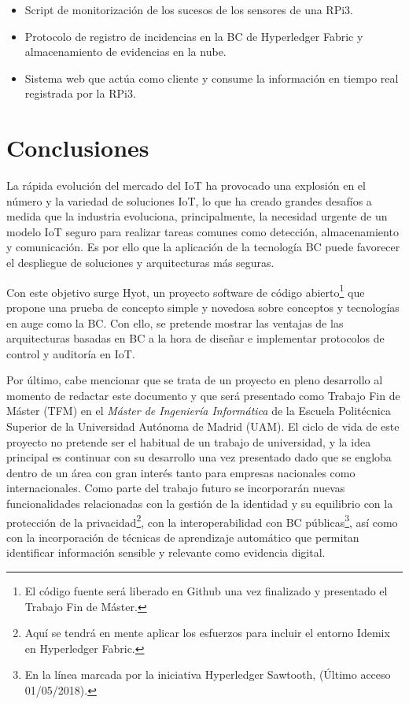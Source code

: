 \documentclass[10pt,conference,a4paper]{IEEEtran}
\begin{document}
\begin{itemize}
  \item Script de monitorización de los sucesos de los sensores de una RPi3.
  \item Protocolo de registro de incidencias en la BC de Hyperledger
    Fabric y almacenamiento de evidencias en la nube. 
  \item Sistema web que actúa como cliente y consume la
          información en tiempo real registrada por la RPi3.
\end{itemize}

\section{Conclusiones}

La rápida evolución del mercado del IoT ha provocado una explosión en
el número y la variedad de soluciones IoT, lo que ha creado grandes
desafíos a medida que la industria evoluciona, principalmente, la
necesidad urgente de un modelo IoT seguro para realizar tareas comunes
como detección, almacenamiento y comunicación. Es por ello que la
aplicación de la tecnología BC puede favorecer el despliegue de
soluciones y arquitecturas más seguras.

Con este objetivo surge Hyot, un proyecto software de código
abierto\footnote{El código fuente será liberado en Github una vez
  finalizado y presentado el Trabajo Fin de Máster.} que propone una
prueba de concepto simple y novedosa sobre conceptos y tecnologías en
auge como la BC. Con ello, se pretende mostrar las ventajas de las
arquitecturas basadas en BC a la hora de diseñar e implementar
protocolos de control y auditoría en IoT.

Por último, cabe mencionar que se trata de un proyecto en pleno
desarrollo al momento de redactar este documento y que será presentado
como Trabajo Fin de Máster (TFM) en el \textit{Máster de Ingeniería
  Informática} de la Escuela Politécnica Superior de la Universidad
Autónoma de Madrid (UAM). El ciclo de vida de este proyecto no pretende ser el
habitual de un trabajo de universidad, y la idea principal es continuar
con su desarrollo una vez presentado dado que se engloba dentro de un
área con  gran interés tanto para empresas nacionales como
internacionales. Como parte del trabajo futuro se incorporarán nuevas
funcionalidades relacionadas con la gestión de la identidad y su
equilibrio con la protección de la privacidad\footnote{Aquí se tendrá
  en mente aplicar los esfuerzos para incluir el entorno Idemix en
  Hyperledger Fabric.}, con la interoperabilidad con BC
públicas\footnote{En la línea marcada por la iniciativa Hyperledger
  Sawtooth, \cite{sawtooth:url}
  (Último acceso 01/05/2018).}, así como con la incorporación de técnicas de
aprendizaje automático  que permitan identificar información sensible
y relevante como evidencia digital. 
 
\end{document}
